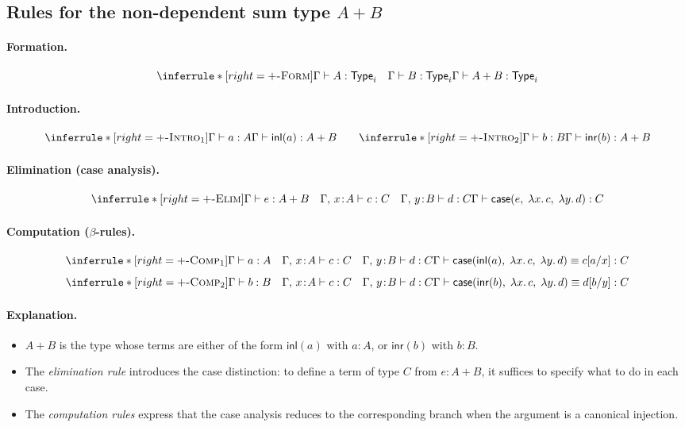 \documentclass{article}
\newcommand{\Type}{\ensuremath{\mathsf{Type}}}
\newcommand{\inl}{\mathsf{inl}}
\newcommand{\inr}{\mathsf{inr}}
\newcommand{\caseof}{\mathsf{case}}
\newcommand{\judg}[3]{#1 \vdash #2 : #3}   %
\newcommand{\jdeq}{\equiv}                 %
\newcommand{\teq}[4]{#1 \vdash #2 \jdeq #3 : #4} %
\newcommand{\rulename}[1]{\textsc{#1}}
\begin{document}
\subsection*{Rules for the non-dependent sum type \texorpdfstring{$A + B$}{A + B}}

\paragraph{Formation.}
\[
\inferrule*[right=\rulename{\(+\)-Form}]{
  \judg{\Gamma}{A}{\Type_i}
  \quad
  \judg{\Gamma}{B}{\Type_i}
}{
  \judg{\Gamma}{A + B}{\Type_i}
}
\]

\paragraph{Introduction.}
\[
\inferrule*[right=\rulename{\(+\)-Intro\(_1\)}]{
  \judg{\Gamma}{a}{A}
}{
  \judg{\Gamma}{\inl(a)}{A + B}
}
\qquad
\inferrule*[right=\rulename{\(+\)-Intro\(_2\)}]{
  \judg{\Gamma}{b}{B}
}{
  \judg{\Gamma}{\inr(b)}{A + B}
}
\]

\paragraph{Elimination (case analysis).}
\[
\inferrule*[right=\rulename{\(+\)-Elim}]{
  \judg{\Gamma}{e}{A + B}
  \quad
  \judg{\Gamma,\,x\!:\!A}{c}{C}
  \quad
  \judg{\Gamma,\,y\!:\!B}{d}{C}
}{
  \judg{\Gamma}{
    \caseof(e,\;\lambda x.\,c,\;\lambda y.\,d)
  }{C}
}
\]

\paragraph{Computation (\(\beta\)-rules).}
\[
\inferrule*[right=\rulename{\(+\)-Comp\(_1\)}]{
  \judg{\Gamma}{a}{A}
  \quad
  \judg{\Gamma,\,x\!:\!A}{c}{C}
  \quad
  \judg{\Gamma,\,y\!:\!B}{d}{C}
}{
  \teq{\Gamma}{
    \caseof(\inl(a),\;\lambda x.\,c,\;\lambda y.\,d)
  }{
    c[a/x]
  }{C}
}
\]
\[
\inferrule*[right=\rulename{\(+\)-Comp\(_2\)}]{
  \judg{\Gamma}{b}{B}
  \quad
  \judg{\Gamma,\,x\!:\!A}{c}{C}
  \quad
  \judg{\Gamma,\,y\!:\!B}{d}{C}
}{
  \teq{\Gamma}{
    \caseof(\inr(b),\;\lambda x.\,c,\;\lambda y.\,d)
  }{
    d[b/y]
  }{C}
}
\]

\paragraph{Explanation.}
\begin{itemize}
  \item \(A + B\) is the type whose terms are either of the form \(\inl(a)\) with \(a:A\),
        or \(\inr(b)\) with \(b:B\).
  \item The \emph{elimination rule} introduces the case distinction:
        to define a term of type \(C\) from \(e:A+B\),
        it suffices to specify what to do in each case.
  \item The \emph{computation rules} express that the case analysis
        reduces to the corresponding branch when the argument
        is a canonical injection.
\end{itemize}
\end{document}
